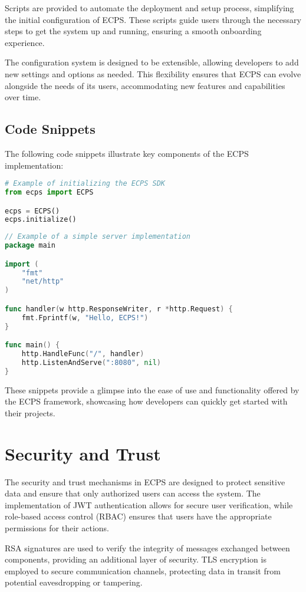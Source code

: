 \documentclass[12pt]{article}
\begin{document}
Scripts are provided to automate the deployment and setup process, simplifying the initial configuration of ECPS. These scripts guide users through the necessary steps to get the system up and running, ensuring a smooth onboarding experience.

The configuration system is designed to be extensible, allowing developers to add new settings and options as needed. This flexibility ensures that ECPS can evolve alongside the needs of its users, accommodating new features and capabilities over time.

\subsection{Code Snippets}
The following code snippets illustrate key components of the ECPS implementation:

\begin{lstlisting}[language=Python]
# Example of initializing the ECPS SDK
from ecps import ECPS

ecps = ECPS()
ecps.initialize()
\end{lstlisting}

\begin{lstlisting}[language=Go]
// Example of a simple server implementation
package main

import (
    "fmt"
    "net/http"
)

func handler(w http.ResponseWriter, r *http.Request) {
    fmt.Fprintf(w, "Hello, ECPS!")
}

func main() {
    http.HandleFunc("/", handler)
    http.ListenAndServe(":8080", nil)
}
\end{lstlisting}

These snippets provide a glimpse into the ease of use and functionality offered by the ECPS framework, showcasing how developers can quickly get started with their projects.

\section{Security and Trust}
The security and trust mechanisms in ECPS are designed to protect sensitive data and ensure that only authorized users can access the system. The implementation of JWT authentication allows for secure user verification, while role-based access control (RBAC) ensures that users have the appropriate permissions for their actions.

RSA signatures are used to verify the integrity of messages exchanged between components, providing an additional layer of security. TLS encryption is employed to secure communication channels, protecting data in transit from potential eavesdropping or tampering.
\end{document}
